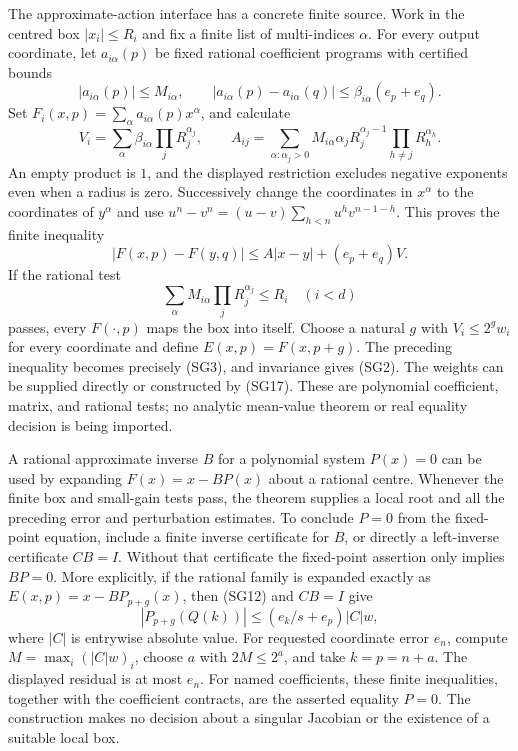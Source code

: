 The approximate-action interface has a concrete finite source.  Work in the
centred box $|x_i|\le R_i$ and fix a finite list of multi-indices $\alpha$.
For every output coordinate, let $a_{i\alpha}(p)$ be fixed rational
coefficient programs with certified bounds
\[
 |a_{i\alpha}(p)|\le M_{i\alpha},\qquad
 |a_{i\alpha}(p)-a_{i\alpha}(q)|
       \le\beta_{i\alpha}(e_p+e_q).
\]
Set $F_i(x,p)=\sum_\alpha a_{i\alpha}(p)x^\alpha$, and calculate
\[
 V_i=\sum_\alpha\beta_{i\alpha}\prod_jR_j^{\alpha_j},\qquad
 A_{ij}=\sum_{\alpha:\alpha_j>0}
 M_{i\alpha}\alpha_jR_j^{\alpha_j-1}
                    \prod_{h\ne j}R_h^{\alpha_h}.
\]
An empty product is $1$, and the displayed restriction excludes negative
exponents even when a radius is zero.  Successively change the coordinates
in $x^\alpha$ to the coordinates of $y^\alpha$ and use
$u^n-v^n=(u-v)\sum_{h<n}u^hv^{n-1-h}$.  This proves the finite inequality
\[
 |F(x,p)-F(y,q)|\le A|x-y|+(e_p+e_q)V.
\]
If the rational test
\[
 \sum_\alpha M_{i\alpha}\prod_jR_j^{\alpha_j}\le R_i
 \quad(i<d)
\]
passes, every $F(\cdot,p)$ maps the box into itself.  Choose a natural $g$
with $V_i\le2^gw_i$ for every coordinate and define
$E(x,p)=F(x,p+g)$.  The preceding inequality becomes precisely (SG3),
and invariance gives (SG2).  The weights can be supplied directly or
constructed by (SG17).  These are polynomial coefficient, matrix, and
rational tests; no analytic mean-value theorem or real equality decision
is being imported.

A rational approximate inverse $B$ for a polynomial system $P(x)=0$ can
be used by expanding $F(x)=x-BP(x)$ about a rational centre.  Whenever
the finite box and small-gain tests pass, the theorem supplies a local
root and all the preceding error and perturbation estimates.  To conclude
$P=0$ from the fixed-point equation, include a finite inverse certificate
for $B$, or directly a left-inverse certificate $CB=I$.  Without that
certificate the fixed-point assertion only implies $BP=0$.
More explicitly, if the rational family is expanded exactly as
$E(x,p)=x-BP_{p+g}(x)$, then (SG12) and $CB=I$ give
\[
 |P_{p+g}(Q(k))|\le (e_k/s+e_p)|C|w,
\]
where $|C|$ is entrywise absolute value.  For requested coordinate error
$e_n$, compute $M=\max_i(|C|w)_i$, choose $a$ with $2M\le2^a$, and
take $k=p=n+a$.  The displayed residual is at most $e_n$.
For named coefficients, these finite inequalities, together with the
coefficient contracts, are the asserted equality $P=0$.  The construction
makes no decision about a singular Jacobian or the existence of a suitable
local box.

